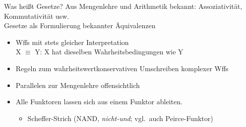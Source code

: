 \begin{frame}
  {Was heißt Gesetze?}
  \label{slide:scheffer}
  \onslide<+->
  \onslide<+->
  Aus Mengenlehre und Arithmetik bekannt: Assoziativität, Kommutativität usw.\\
  \onslide<+->
  \alert{Gesetze als Formulierung bekannter Äquivalenzen }\\
  \Halbzeile
  \begin{itemize}[<+->]
    \item Wffs mit stets gleicher Interpretation\\
      \alert{X $\equiv$ Y}: X hat dieselben Wahrheitsbedingungen wie Y
    \item Regeln zum wahrheitswertkonservativen Umschreiben komplexer Wffs
    \item Parallelen zur Mengenlehre offensichtlich\\
      \Halbzeile
    \item Alle Funktoren lassen sich aus \alert{einem Funktor} ableiten.
      \begin{itemize}[<+->]
        \item[ ] Scheffer-Strich (NAND, \textit{nicht-und}; vgl.\ auch Peirce-Funktor)\\
      \end{itemize}
  \end{itemize}
\end{frame}

